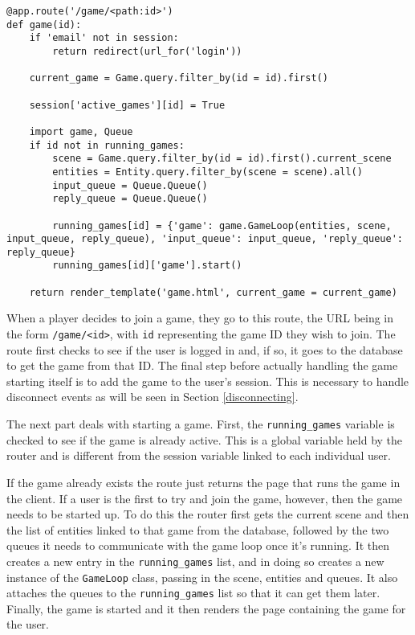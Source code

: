 \noindent
\begin{minipage}{\linewidth}
\begin{lstlisting}[style=py, caption={The route responsible for starting a game thread.}, label=game_route]
@app.route('/game/<path:id>')
def game(id):
    if 'email' not in session:
        return redirect(url_for('login'))

    current_game = Game.query.filter_by(id = id).first()

    session['active_games'][id] = True

    import game, Queue
    if id not in running_games:
        scene = Game.query.filter_by(id = id).first().current_scene
        entities = Entity.query.filter_by(scene = scene).all()
        input_queue = Queue.Queue()
        reply_queue = Queue.Queue()

        running_games[id] = {'game': game.GameLoop(entities, scene, input_queue, reply_queue), 'input_queue': input_queue, 'reply_queue': reply_queue}
        running_games[id]['game'].start()

    return render_template('game.html', current_game = current_game)
\end{lstlisting}
\end{minipage}

When a player decides to join a game, they go to this route, the URL being in the form \texttt{/game/<id>}, with \texttt{id} representing the game ID they wish to join. The route first checks to see if the user is logged in and, if so, it goes to the database to get the game from that ID. The final step before actually handling the game starting itself is to add the game to the user's session. This is necessary to handle disconnect events as will be seen in Section \ref{disconnecting}.

The next part deals with starting a game. First, the \texttt{running\_games} variable is checked to see if the game is already active. This is a global variable held by the router and is different from the session variable linked to each individual user.

If the game already exists the route just returns the page that runs the game in the client. If a user is the first to try and join the game, however, then the game needs to be started up. To do this the router first gets the current scene and then the list of entities linked to that game from the database, followed by the two queues it needs to communicate with the game loop once it's running. It then creates a new entry in the \texttt{running\_games} list, and in doing so creates a new instance of the \texttt{GameLoop} class, passing in the scene, entities and queues. It also attaches the queues to the \texttt{running\_games} list so that it can get them later. Finally, the game is started and it then renders the page containing the game for the user.


